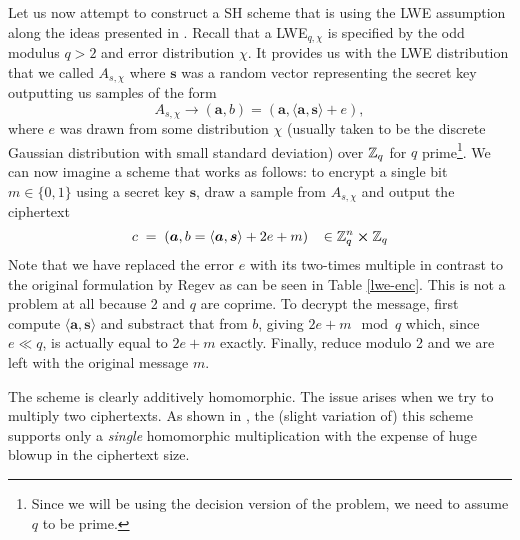  Let us now attempt to construct a SH scheme that is using the LWE assumption along the ideas presented in \cite{fhe-lwe}. Recall that a LWE$_{q, \chi}$ is specified by the odd modulus $q > 2$ and error distribution $\chi$. It provides us with the LWE distribution that we called $A_{s, \chi}$ where $\bm{s}$ was a random vector representing the secret key outputting us samples of the form
\[A_{s, \chi} \rightarrow (\bm{a}, b) = (\bm{a}, \langle \bm{a}, \bm{s} \rangle + e),\]
where $e$ was drawn from some distribution $\chi$ (usually taken to be the discrete Gaussian distribution with small standard deviation) over $\mathbb{Z}_q$ for $q$ prime\footnote{Since we will be using the decision version of the problem, we need to assume $q$ to be prime.}. We can now imagine a scheme that works as follows: to encrypt a single bit $m \in \{0,1\}$ using a secret key $\bm{s}$, draw a sample from $A_{s, \chi}$ and output the ciphertext
\[ c \; = \; (\boldsymbol{a}, b = \langle \boldsymbol{a}, \boldsymbol{s} \rangle +2e +m) \; \; \; \in \mathbb{Z}_q^n \cross \mathbb{Z}_q \]
Note that we have replaced the error $e$ with its two-times multiple in contrast to the original formulation by Regev as can be seen in Table \ref{lwe-enc}. This is not a problem at all because 2 and $q$ are coprime. To decrypt the message, first compute $\langle \bm{a},\bm{s} \rangle$ and substract that from $b$, giving $2e + m \mod q$ which, since $e \ll q$, is actually equal to $2e +m$ exactly. Finally, reduce modulo 2 and we are left with the original message $m$.

The scheme is clearly additively homomorphic. The issue arises when we try to multiply two ciphertexts. As shown in \cite{one-mult}, the (slight variation of) this scheme supports only a \textit{single} homomorphic multiplication with the expense of huge blowup in the ciphertext size.

